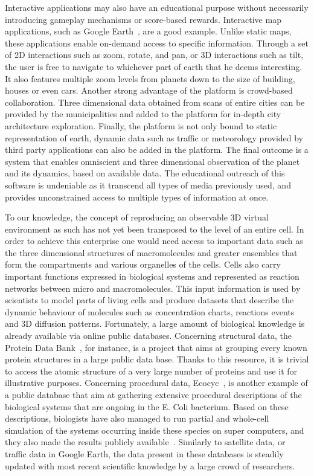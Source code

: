Interactive applications may also have an educational purpose without necessarily introducing gameplay mechanisms or score-based rewards. 
Interactive map applications, such as Google Earth~\cite{gearth2001}, are a good example.
Unlike static maps, these applications enable on-demand access to specific information.
Through a set of 2D interactions such as zoom, rotate, and pan, or 3D interactions such as tilt, the user is free to navigate to whichever part of earth that he deems interesting.
It also features multiple zoom levels from planets down to the size of building, houses or even cars.
Another strong advantage of the platform is crowd-based collaboration.
Three dimensional data obtained from scans of entire cities can be provided by the municipalities and added to the platform for in-depth city architecture exploration.
Finally, the platform is not only bound to static representation of earth, dynamic data such as traffic or meteorology provided by third party applications can also be added in the platform.
The final outcome is a system that enables omniscient and three dimensional observation of the planet and its dynamics, based on available data.
The educational outreach of this software is undeniable as it transcend all types of media previously used, and provides unconstrained access to multiple types of information at once. 

To our knowledge, the concept of reproducing an observable 3D virtual environment as such has not yet been transposed to the level of an entire cell.
In order to achieve this enterprise one would need access to important data such as the three dimensional structures of macromolecules and greater ensembles that form the compartments and various organelles of the cells.
Cells also carry important functions expressed in biological systems and represented as reaction networks between micro and macromolecules.
This input information is used by scientists to model parts of living cells and produce datasets that describe the dynamic behaviour of molecules such as concentration charts, reactions events and 3D diffusion patterns.
Fortunately, a large amount of biological knowledge is already available via online public databases.
Concerning structural data, the Protein Data Bank~\cite{bernstein1977protein}, for instance, is a project that aims at grouping every known protein structures in a large public data base.
Thanks to this resource, it is trivial to access the atomic structure of a very large number of proteins and use it for illustrative purposes.
Concerning procedural data, Ecocyc~\cite{keseler2005ecocyc}, is another example of a public database that aim at gathering extensive procedural descriptions of the biological systems that are ongoing in the E. Coli bacterium.
Based on these descriptions, biologists have also managed to run partial and whole-cell simulation of the systems occurring inside these species on super computers, and they also made the results publicly available~\cite{karr2014wholecellsimdb}.
Similarly to satellite data, or traffic data in Google Earth, the data present in these databases is steadily updated with most recent scientific knowledge by a large crowd of researchers.

